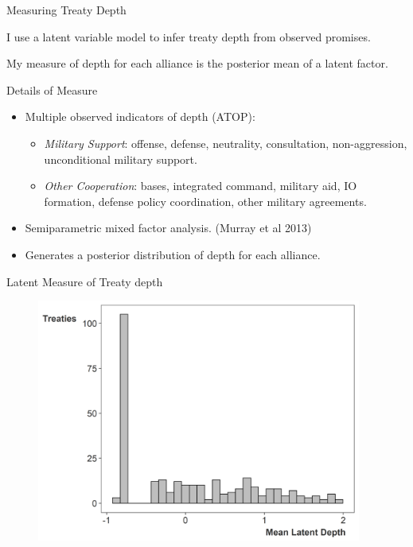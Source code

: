 \documentclass[12pt]{beamer}
\begin{document}

\begin{frame}{Measuring Treaty Depth}

I use a latent variable model to infer treaty depth from observed promises. 

\pause 

My measure of depth for each alliance is the posterior mean of a latent factor. 

\end{frame} 


\begin{frame}{Details of Measure}
 
\begin{itemize}
\item Multiple observed indicators of depth (ATOP): 
\begin{itemize} 
\item \textit{Military Support}: offense, defense, neutrality, consultation, non-aggression, unconditional military support.
\item \textit{Other Cooperation}: bases, integrated command, military aid, IO formation, defense policy coordination, other military agreements. 
\end{itemize} 
\pause 
\item Semiparametric mixed factor analysis. (Murray et al 2013)
\pause
\item Generates a posterior distribution of depth for each alliance.
\end{itemize} 


\end{frame} 


\begin{frame}{Latent Measure of Treaty depth}

\begin{figure}[htbp]
	\centering
		\includegraphics[width=0.95\textwidth]{ld-hist.png}
\end{figure}


\end{frame} 
\end{document}
